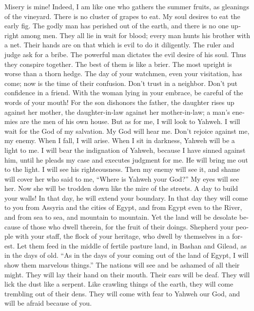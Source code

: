 \begin{paracol}{2}
\begin{otherlanguage}{english}
 Misery is mine! Indeed, I am like one who gathers the
summer fruits, as gleanings of the vineyard. There is no cluster of
grapes to eat. My soul desires to eat the early fig.  The
godly man has perished out of the earth, and there is no one upright
among men. They all lie in wait for blood; every man hunts his brother
with a net.  Their hands are on that which is evil to do
it diligently. The ruler and judge ask for a bribe. The powerful man
dictates the evil desire of his soul. Thus they conspire together.
 The best of them is like a brier. The most upright is
worse than a thorn hedge. The day of your watchmen, even your
visitation, has come; now is the time of their confusion. 
Don't trust in a neighbor. Don't put confidence in a friend. With the
woman lying in your embrace, be careful of the words of your mouth!
 For the son dishonors the father, the daughter rises up
against her mother, the daughter-in-law against her mother-in-law; a
man's enemies are the men of his own house.  But as for
me, I will look to Yahweh. I will wait for the God of my salvation. My
God will hear me.  Don't rejoice against me, my enemy.
When I fall, I will arise. When I sit in darkness, Yahweh will be a
light to me.  I will bear the indignation of Yahweh,
because I have sinned against him, until he pleads my case and executes
judgment for me. He will bring me out to the light. I will see his
righteousness.  Then my enemy will see it, and shame will
cover her who said to me, ``Where is Yahweh your God?'' My eyes will see
her. Now she will be trodden down like the mire of the streets.
 A day to build your walls! In that day, he will extend
your boundary.  In that day they will come to you from
Assyria and the cities of Egypt, and from Egypt even to the River, and
from sea to sea, and mountain to mountain.  Yet the land
will be desolate because of those who dwell therein, for the fruit of
their doings.  Shepherd your people with your staff, the
flock of your heritage, who dwell by themselves in a forest. Let them
feed in the middle of fertile pasture land, in Bashan and Gilead, as in
the days of old.  ``As in the days of your coming out of
the land of Egypt, I will show them marvelous things.'' 
The nations will see and be ashamed of all their might. They will lay
their hand on their mouth. Their ears will be deaf.  They
will lick the dust like a serpent. Like crawling things of the earth,
they will come trembling out of their dens. They will come with fear to
Yahweh our God, and will be afraid because of you.


\end{otherlanguage}
\end{paracol}
